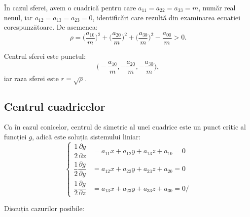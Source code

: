În cazul sferei, avem o cuadrică pentru care $a_{11} = a_{22} = a_{33} = m$,
număr real nenul, iar $a_{12} = a_{13} = a_{23} = 0$, identificări care rezultă
din examinarea ecuației corespunzătoare. De asemenea: 
 \[
	\rho = \Big( \dfrac{a_{10}}{m} \Big)^2 + 
	        \Big( \dfrac{a_{20}}{m} \Big)^2 + 
	        \Big( \dfrac{a_{30}}{m} \Big)^2 -
	        \dfrac{a_{00}}{m} > 0.
\]

Centrul sferei este punctul: \[
	\Big( -\dfrac{a_{10}}{m}, - \dfrac{a_{20}}{m}, - \dfrac{a_{30}}{m} \Big),
\]
iar raza sferei este $r = \sqrt{\rho}$.


\subsection{Centrul cuadricelor}

\indent\indent Ca în cazul conicelor, centrul de simetrie al unei cuadrice
este un punct critic al funcției $g$, adică este soluția sistemului liniar: 
 \[
	\begin{cases}	
	    \dfrac{1}{2} \dfrac{\partial g}{\partial x} &=
	    a_{11} x + a_{12}y + a_{13} z + a_{10} = 0 \\
	    \dfrac{1}{2} \dfrac{\partial g}{\partial y} &= 
	    a_{12} x + a_{22} y + a_{23} z + a_{20} = 0 \\
	    \dfrac{1}{2} \dfrac{\partial g}{\partial z} &= 
	    a_{13} x + a_{23}y + a_{33} z + a_{30} = 0/
    \end{cases}
\]

Discuția cazurilor posibile:

